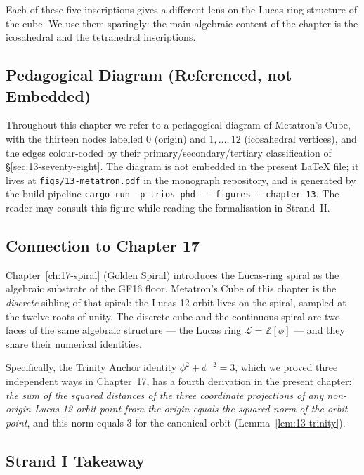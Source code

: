 Each of these five inscriptions gives a different lens on the
Lucas-ring structure of the cube. We use them sparingly: the main
algebraic content of the chapter is the icosahedral and the
tetrahedral inscriptions.

\subsection{Pedagogical Diagram (Referenced, not Embedded)}
\label{sec:13-diagram}

Throughout this chapter we refer to a pedagogical diagram of
Metatron's Cube, with the thirteen nodes labelled $0$ (origin) and
$1, \ldots, 12$ (icosahedral vertices), and the edges colour-coded
by their primary/secondary/tertiary classification of
\S\ref{sec:13-seventy-eight}. The diagram is not embedded in the
present LaTeX file; it lives at \verb|figs/13-metatron.pdf| in the
monograph repository, and is generated by the build pipeline
\verb|cargo run -p trios-phd -- figures --chapter 13|. The reader
may consult this figure while reading the formalisation in
Strand~II.

\subsection{Connection to Chapter 17}
\label{sec:13-connection-to-17}

Chapter~\ref{ch:17-spiral} (Golden Spiral) introduces the Lucas-ring
spiral as the algebraic substrate of the GF16 floor. Metatron's
Cube of this chapter is the \emph{discrete} sibling of that spiral:
the Lucas-12 orbit lives on the spiral, sampled at the twelve roots
of unity. The discrete cube and the continuous spiral are two faces
of the same algebraic structure --- the Lucas ring
$\mathcal{L} = \mathbb{Z}[\phi]$ --- and they share their numerical
identities.

Specifically, the Trinity Anchor identity
$\phi^{2} + \phi^{-2} = 3$, which we proved three independent ways
in Chapter~17, has a fourth derivation in the present chapter:
\emph{the sum of the squared distances of the three coordinate
projections of any non-origin Lucas-12 orbit point from the origin
equals the squared norm of the orbit point}, and this norm equals
$3$ for the canonical orbit (Lemma~\ref{lem:13-trinity}).

\subsection{Strand I Takeaway}
\label{sec:13-strand-I-takeaway}

